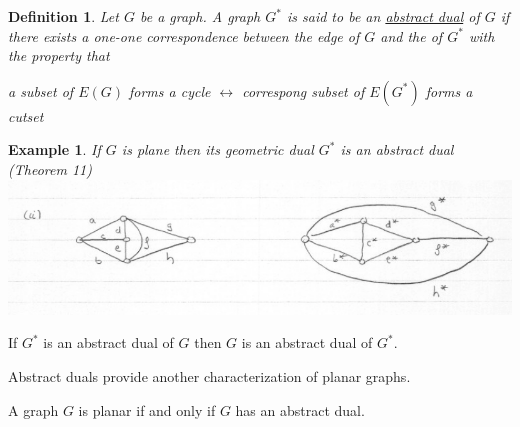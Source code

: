 \documentclass[12pt]{article}
\newenvironment{theorem}[1]{%
  \renewcommand\themanualtheoreminner{#1}%
  \manualtheoreminner
}{\endmanualtheoreminner}
\newtheorem{example}{Example}
\newtheorem{definition}{Definition}
\begin{document}
\begin{definition}
  Let $G$ be a graph. A graph $G^{*}$ is said to be an \underline{abstract dual} of $G$ if there exists a one-one correspondence between the edge of $G$ and the of $G^{*}$ with the property that

  a subset of $E(G)$ forms a cycle $\leftrightarrow$ correspong subset of $E(G^{*})$ forms a cutset
\end{definition}

\begin{example}
  If $G$ is plane then its geometric dual $G^{*}$ is an abstract dual (Theorem 11)
  \includegraphics[scale=0.5]{dual2}
\end{example}


\begin{theorem}{14}
  If $G^{*}$ is an abstract dual of $G$ then $G$ is an abstract dual of $G^{*}$.

  Abstract duals provide another characterization of planar graphs.
\end{theorem}

\begin{theorem}{15}
A graph $G$ is planar if and only if $G$ has an abstract dual.
\end{theorem}
\end{document}
